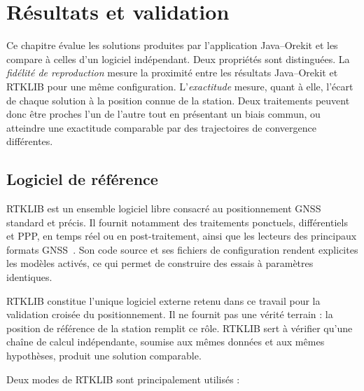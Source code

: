 
\chapter{Résultats et validation}
\label{resultats_validation}

Ce chapitre évalue les solutions produites par l'application Java--Orekit et
les compare à celles d'un logiciel indépendant. Deux propriétés sont
distinguées. La \emph{fidélité de reproduction} mesure la proximité entre les
résultats Java--Orekit et RTKLIB pour une même configuration. L'\emph{exactitude}
mesure, quant à elle, l'écart de chaque solution à la position connue de la
station. Deux traitements peuvent donc être proches l'un de l'autre tout en
présentant un biais commun, ou atteindre une exactitude comparable par des
trajectoires de convergence différentes.


\section{Logiciel de référence}
\label{sec:rtklib_reference}

RTKLIB est un ensemble logiciel libre consacré au positionnement GNSS standard
et précis. Il fournit notamment des traitements ponctuels, différentiels et
PPP, en temps réel ou en post-traitement, ainsi que les lecteurs des principaux
formats GNSS~\cite{rtklib_manual_242}. Son code source et ses fichiers de
configuration rendent explicites les modèles activés, ce qui permet de
construire des essais à paramètres identiques.

RTKLIB constitue l'unique logiciel externe retenu dans ce travail pour la
validation croisée du positionnement. Il ne fournit pas une vérité terrain :
la position de référence de la station remplit ce rôle. RTKLIB sert à vérifier
qu'une chaîne de calcul indépendante, soumise aux mêmes données et aux mêmes
hypothèses, produit une solution comparable.

Deux modes de RTKLIB sont principalement utilisés :

